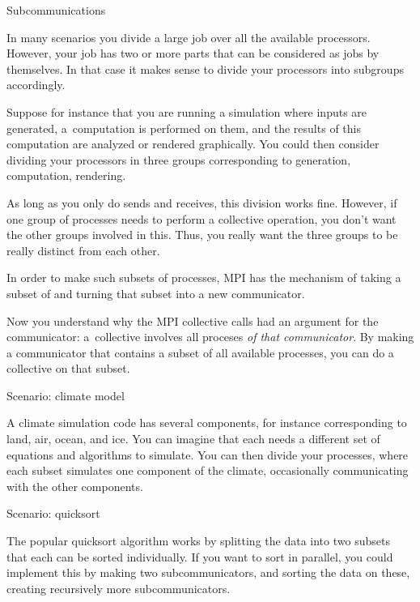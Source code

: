 
 {Subcommunications}
\label{sec:communicators}

In many scenarios you divide a large job over all the available processors.
However, your job has two or more parts that can be considered as
jobs by themselves. In that case it makes sense to divide your processors
into subgroups accordingly.

Suppose for instance that you are running a simulation where inputs are generated,
a~computation is performed on them, and the results of this computation
are analyzed or rendered graphically. You could then consider dividing your
processors in three groups corresponding to generation, computation, rendering.

As long as you only do sends and receives, this division works fine. However,
if one group of processes needs to perform a collective operation, you don't
want the other groups involved in this. Thus, you really want the three groups
to be really distinct from each other.

In order to make such subsets of processes, MPI has the mechanism of
taking a subset of  and turning that subset
into a new communicator.

Now you understand why the MPI collective calls had an argument for the
communicator: a~collective involves all proceses \emph{of that communicator}.
By making a communicator that contains a subset of all available processes,
you can do a collective on that subset.

 {Scenario: climate model}

A climate simulation code has several components, for instance corresponding
to land, air, ocean, and ice. You can imagine that each needs a different set
of equations and algorithms to simulate. You can then divide your processes,
where each subset simulates one component of the climate, occasionally communicating
with the other components.

 {Scenario: quicksort}

The popular quicksort algorithm works by splitting the data
into two subsets that each can be sorted individually.
If you want to sort in parallel, you could implement this by making two subcommunicators,
and sorting the data on these, creating recursively more subcommunicators.

